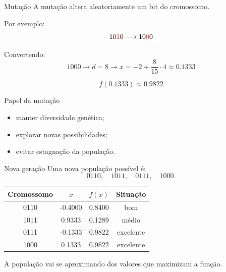 \documentclass[mathserif, 10pt]{beamer}
\newcommand{\tred}[1]{\textcolor{red}{#1}}
\begin{document}
\begin{frame}{Mutação}
	A mutação altera aleatoriamente um bit do cromossomo.
	
	\pause
	
	Por exemplo:
	\[
	10\tred{1}0 \longrightarrow 10 \tred{0}0
	\]
	
	\pause
	
	Convertendo:
	\[
	1000 \to d=8 \to x=-2+\frac{8}{15}\cdot 4\approx 0.1333
	\]
	
	\[
	f(0.1333)\approx 0.9822
	\]
	
	\pause
	
	\begin{block}{Papel da mutação}
		\begin{itemize}
			\item manter diversidade genética;
			\item explorar novas possibilidades;
			\item evitar estagnação da população.
		\end{itemize}
	\end{block}
\end{frame}

\begin{frame}{Nova geração}
	Uma nova população possível é:
	\[
	0110,\quad 1011,\quad 0111,\quad 1000.
	\]
	
	\pause
	
	\begin{center}
		\begin{tabular}{cccc}
			\toprule
			Cromossomo & \(x\) & \(f(x)\) & Situação \\
			\midrule
			0110 & -0.4000 & 0.8400 & bom \\
			1011 & 0.9333  & 0.1289 & médio \\
			0111 & -0.1333 & 0.9822 & excelente \\
			1000 & 0.1333  & 0.9822 & excelente \\
			\bottomrule
		\end{tabular}
	\end{center}
	
	\pause
	
	A população vai se aproximando dos valores que maximizam a função.
\end{frame}
\end{document}
